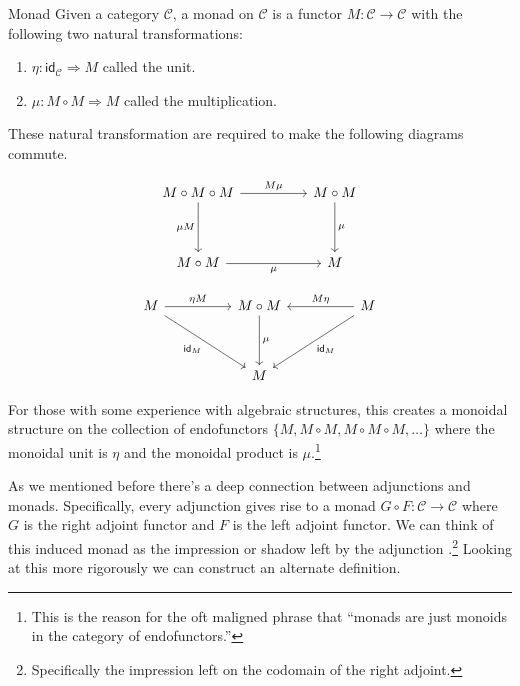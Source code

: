 \documentclass[12pt]{article}
\begin{document}
\begin{definition}{Monad}{}
  Given a category $\mathcal{C}$, a monad on $\mathcal{C}$ is a functor $M:\mathcal{C}\rightarrow\mathcal{C}$ with the following two natural transformations:
  \begin{enumerate}
    \item $\eta : \mathsf{id}_{\mathcal{C}} \Rightarrow M$ called the unit.
    \item $\mu: M\circ M \Rightarrow M$ called the multiplication.
  \end{enumerate}
  These natural transformation are required to make the following diagrams commute.

  \[\begin{tikzcd}
      M\circ M\circ M && M\circ M \\
      \\
      M\circ M && M
      \arrow["M\mu", from=1-1, to=1-3]
      \arrow["\mu", from=1-3, to=3-3]
      \arrow["\mu"', from=3-1, to=3-3]
      \arrow["{\mu M}"', from=1-1, to=3-1]
    \end{tikzcd}\]

  \[\begin{tikzcd}
      M && M\circ M && M \\
      \\
      && M
      \arrow["{\eta M}", from=1-1, to=1-3]
      \arrow["M\eta"', from=1-5, to=1-3]
      \arrow["\mu", from=1-3, to=3-3]
      \arrow["{\mathsf{id}_M}", from=1-5, to=3-3]
      \arrow["{\mathsf{id}_M}"', from=1-1, to=3-3]
    \end{tikzcd}\]

  For those with some experience with algebraic structures, this creates a monoidal structure on the collection of endofunctors $\{M, M\circ M, M\circ M\circ M,\dots\}$ where the monoidal unit is $\eta$ and the monoidal product is $\mu$.\footnote{This is the reason for the oft maligned phrase that ``monads are just monoids in the category of endofunctors.''}
\end{definition}

As we mentioned before there's a deep connection between adjunctions and monads.
Specifically, every adjunction gives rise to a monad $G \circ F: \mathcal{C} \rightarrow \mathcal{C}$ where $G$ is the right adjoint functor and $F$ is the left adjoint functor.
We can think of this induced monad as the impression or shadow left by the adjunction \cite{riehl2017category}.\footnote{Specifically the impression left on the codomain of the right adjoint.}
Looking at this more rigorously we can construct an alternate definition.
\end{document}

